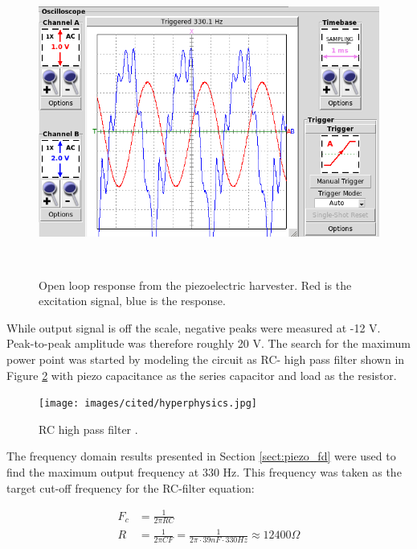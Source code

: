 \begin{figure}[htb]
\begin{center}
\includegraphics[height=10cm]{images/own_measurement/generator_shaker/piezo_td_open_330hz_2_2.png}
\end{center}
\caption{\label{fig:piezo_td_open} Open loop response from the piezoelectric harvester. Red is the excitation signal, blue is the response.}
\end{figure}

While output signal is off the scale, negative peaks were measured at -12 V. Peak-to-peak amplitude was therefore roughly 20 V. The search for the maximum power point was started by modeling the circuit as RC- high pass filter shown in Figure \ref{fig:rc_highpass} with piezo capacitance as the series capacitor and load as the resistor. 

\begin{figure}[htb]
\begin{center}
\texttt{[image: images/cited/hyperphysics.jpg]}
\end{center}
\caption{\label{fig:rc_highpass} RC high pass filter \cite{hyperphysics}.}
\end{figure}

The frequency domain results presented in Section \ref{sect:piezo_fd} were used to find the maximum output frequency at 330 Hz. This frequency was taken as the target cut-off frequency for the RC-filter equation:

\begin{equation}
\begin{split}
  F_c &= \frac{1}{2 \pi R C} \\
  R   &= \frac{1}{2 \pi C F}  = \frac{1}{2 \pi \cdot 39 nF \cdot 330 Hz} \approx 12 400 \Omega 
\end{split}
\end{equation}

